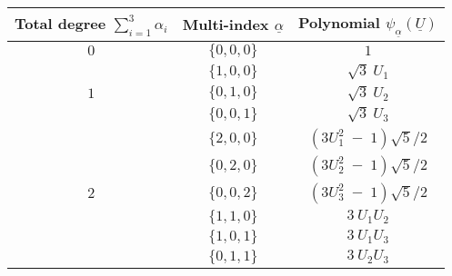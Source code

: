 {              \begin{center}
                \begin{tabular}{ccc}
                  \hline
                  Total degree $\sum_{i=1}^3 \alpha_i$ & Multi-index $\underline{\alpha}$ & Polynomial $\psi_{\underline{\alpha}}(\underline{U})$ \\
                  \hline
                  $0$    & $\{0,0,0\}$                      & $1$                      \\
                  \hline
                  & $\{1,0,0\}$                      & $\sqrt{3}~U_1$                     \\
                  $1$    & $\{0,1,0\}$                      & $\sqrt{3}~U_2$                     \\
                  & $\{0,0,1\}$                      & $\sqrt{3}~U_3$                     \\
                  \hline
                  & $\{2,0,0\}$                      & $(3 U_1^2 \; - \; 1) \sqrt{5}/2$ \\
                  & $\{0,2,0\}$                      & $(3 U_2^2 \; - \; 1) \sqrt{5}/2$ \\
                  $2$     & $\{0,0,2\}$                      & $(3 U_3^2 \; - \; 1) \sqrt{5}/2$ \\
                  & $\{1,1,0\}$                      & $3~U_1 U_2$ \\
                  & $\{1,0,1\}$                      & $3~U_1 U_3$ \\
                  & $\{0,1,1\}$                      & $3~U_2 U_3$ \\
                  \hline
                \end{tabular}
              \end{center}

            }
